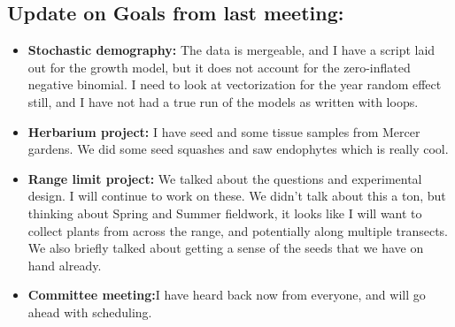 \documentclass{article}
\begin{document}
\subsection*{Update on Goals from last meeting:}
\begin{itemize}
\item{\textbf{Stochastic demography:} The data is mergeable, and I have a script laid out for the growth model, but it does not account for the zero-inflated negative binomial. I need to look at vectorization for the year random effect still, and I have not had a true run of the models as written with loops.}
\item{\textbf{Herbarium project:} I have seed and some tissue samples from Mercer gardens. We did some seed squashes and saw endophytes which is really cool.}
\item{\textbf{Range limit project:} We talked about the questions and experimental design. I will continue to work on these. We didn't talk about this a ton, but thinking about Spring and Summer fieldwork, it looks like I will want to collect plants from across the range, and potentially along multiple transects. We also briefly talked about getting a sense of the seeds that we have on hand already.}
\item{\textbf{Committee meeting:}I have heard back now from everyone, and will go ahead with scheduling.}
\end{itemize}
\end{document}
